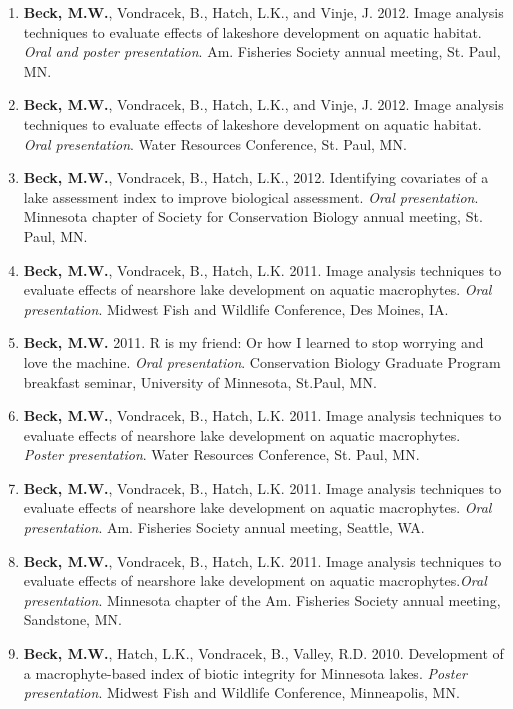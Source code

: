 \documentclass[letterpaper,12pt]{article}
\begin{document}
\begin{enumerate}
\item {\bf Beck, M.W.}, Vondracek, B., Hatch, L.K., and Vinje, J. 2012. Image analysis techniques to evaluate effects of lakeshore development on aquatic habitat. \textit{Oral and poster presentation}. Am. Fisheries Society annual meeting, St. Paul, MN.

\item {\bf Beck, M.W.}, Vondracek, B., Hatch, L.K., and Vinje, J. 2012. Image analysis techniques to evaluate effects of lakeshore development on aquatic habitat. \textit{Oral presentation}. Water Resources Conference, St. Paul, MN.

\item {\bf Beck, M.W.}, Vondracek, B., Hatch, L.K., 2012. Identifying covariates of a lake assessment index to improve biological assessment. \textit{Oral presentation}. Minnesota chapter of Society for Conservation Biology annual meeting, St. Paul, MN.

\item {\bf Beck, M.W.}, Vondracek, B., Hatch, L.K. 2011. Image analysis techniques to evaluate effects of nearshore lake development on aquatic macrophytes. \textit{Oral presentation}. Midwest Fish and Wildlife Conference, Des Moines, IA.

\item {\bf Beck, M.W.} 2011. R is my friend: Or how I learned to stop worrying and love the machine. \textit{Oral presentation}. Conservation Biology Graduate Program breakfast seminar, University of Minnesota, St.Paul, MN.

\item {\bf Beck, M.W.}, Vondracek, B., Hatch, L.K. 2011. Image analysis techniques to evaluate effects of nearshore lake development on aquatic macrophytes. \textit{Poster presentation}. Water Resources Conference, St. Paul, MN.

\item {\bf Beck, M.W.}, Vondracek, B., Hatch, L.K. 2011. Image analysis techniques to evaluate effects of nearshore lake development on aquatic macrophytes. \textit{Oral presentation}. Am. Fisheries Society annual meeting, Seattle, WA.

\item {\bf Beck, M.W.}, Vondracek, B., Hatch, L.K. 2011. Image analysis techniques to evaluate effects of nearshore lake development on aquatic macrophytes.\textit{Oral presentation}. Minnesota chapter of the Am. Fisheries Society annual meeting, Sandstone, MN.

\item {\bf Beck, M.W.}, Hatch, L.K., Vondracek, B., Valley, R.D. 2010. Development of a macrophyte-based index of biotic integrity for Minnesota lakes. \textit{Poster presentation}. Midwest Fish and Wildlife Conference, Minneapolis, MN.


\end{enumerate}
\end{document}
